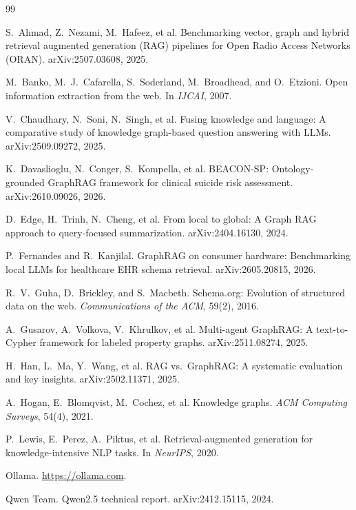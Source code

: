 \documentclass[11pt]{article}
\begin{document}
\begin{thebibliography}{99}\small

 S.~Ahmad, Z.~Nezami, M.~Hafeez, et al. Benchmarking vector, graph and hybrid retrieval augmented generation (RAG) pipelines for Open Radio Access Networks (ORAN). arXiv:2507.03608, 2025.

 M.~Banko, M.~J.~Cafarella, S.~Soderland, M.~Broadhead, and O.~Etzioni. Open information extraction from the web. In \emph{IJCAI}, 2007.

 V.~Chaudhary, N.~Soni, N.~Singh, et al. Fusing knowledge and language: A comparative study of knowledge graph-based question answering with LLMs. arXiv:2509.09272, 2025.

 K.~Davaslioglu, N.~Conger, S.~Kompella, et al. BEACON-SP: Ontology-grounded GraphRAG framework for clinical suicide risk assessment. arXiv:2610.09026, 2026.

 D.~Edge, H.~Trinh, N.~Cheng, et al. From local to global: A Graph RAG approach to query-focused summarization. arXiv:2404.16130, 2024.

 P.~Fernandes and R.~Kanjilal. GraphRAG on consumer hardware: Benchmarking local LLMs for healthcare EHR schema retrieval. arXiv:2605.20815, 2026.

 R.~V.~Guha, D.~Brickley, and S.~Macbeth. Schema.org: Evolution of structured data on the web. \emph{Communications of the ACM}, 59(2), 2016.

 A.~Gusarov, A.~Volkova, V.~Khrulkov, et al. Multi-agent GraphRAG: A text-to-Cypher framework for labeled property graphs. arXiv:2511.08274, 2025.

 H.~Han, L.~Ma, Y.~Wang, et al. RAG vs.\ GraphRAG: A systematic evaluation and key insights. arXiv:2502.11371, 2025.

 A.~Hogan, E.~Blomqvist, M.~Cochez, et al. Knowledge graphs. \emph{ACM Computing Surveys}, 54(4), 2021.

 P.~Lewis, E.~Perez, A.~Piktus, et al. Retrieval-augmented generation for knowledge-intensive NLP tasks. In \emph{NeurIPS}, 2020.

 Ollama. \url{https://ollama.com}.

 Qwen Team. Qwen2.5 technical report. arXiv:2412.15115, 2024.


\end{thebibliography}
\end{document}

